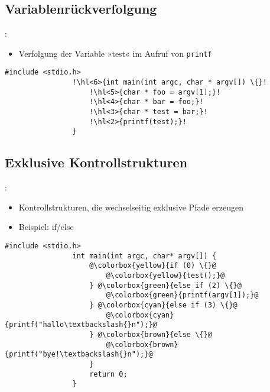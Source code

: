     \subsection{Variablenrückverfolgung}
        \begin{frame}[fragile]{\secname: \subsecname}
            \begin{itemize}
                \item Verfolgung der Variable »test« im Aufruf von \texttt{printf}
            \end{itemize}
            \begin{lstlisting}[gobble=16, escapechar=!]
                #include <stdio.h>
                !\hl<6>{int main(int argc, char * argv[]) \{}!
                    !\hl<5>{char * foo = argv[1];}!
                    !\hl<4>{char * bar = foo;}!
                    !\hl<3>{char * test = bar;}!
                    !\hl<2>{printf(test);}!
                }
            \end{lstlisting}
        \end{frame}

    \subsection{Exklusive Kontrollstrukturen}
        \begin{frame}[fragile]{\secname: \subsecname}
            \begin{itemize}
                \item Kontrollstrukturen, die wechselseitig exklusive Pfade erzeugen
                \item Beispiel: if/else
            \end{itemize}
            \begin{lstlisting}[gobble=16, escapechar=@]
                #include <stdio.h>
                int main(int argc, char* argv[]) {
                    @\colorbox{yellow}{if (0) \{}@
                        @\colorbox{yellow}{test();}@
                    } @\colorbox{green}{else if (2) \{}@
                        @\colorbox{green}{printf(argv[1]);}@
                    } @\colorbox{cyan}{else if (3) \{}@
                        @\colorbox{cyan}{printf("hallo\textbackslash{}n");}@
                    } @\colorbox{brown}{else \{}@
                        @\colorbox{brown}{printf("bye!\textbackslash{}n");}@
                    }
                    return 0;
                }
            \end{lstlisting}
        \end{frame}

